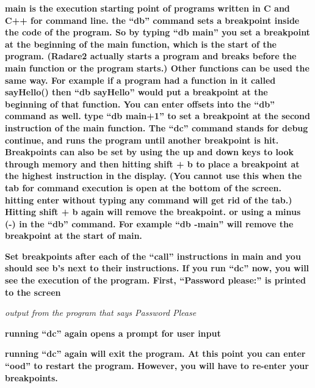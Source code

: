 \documentclass[letterpaper]{article}
\newcommand{\sitfig}[3]{
\begin{figure}[H]
\centering
\makebox[\textwidth][c]{
#2
}
\label{#1}
\end{figure}
}
\newcommand{\sitgfx}[4][scale=1.0]{
\sitfig{#3}{\texttt{[image: \#2]}}{#4}
}
\begin{document}
  
\sitgfx[width=5.8335in,height=3.6457in]{FINALWORKINGDOCFORMERLYPRECURSOR-img080.png}{fig:unk}{TODO CAPTION}
 

\textbf{main is the execution starting point of programs written in C and C++ for command line. the ``db'' command sets
a breakpoint inside the code of the program. So by typing ``db main'' you set a breakpoint at the beginning of the main
function, which is the start of the program. (Radare2 actually starts a program and breaks before the main function or
the program starts.) Other functions can be used the same way. For example if a program had a function in it called
sayHello() then ``db sayHello'' would put a breakpoint at the beginning of that function. You can enter offsets into
the ``db'' command as well. type ``db main+1'' to set a breakpoint at the second instruction of the main function. The
``dc'' command stands for debug continue, and runs the program until another breakpoint is hit. Breakpoints can also be
set by using the up and down keys to look through memory and then hitting shift + b to place a breakpoint at the
highest instruction in the display. (You cannot use this when the tab for command execution is open at the bottom of
the screen. hitting enter without typing any command will get rid of the tab.) Hitting shift + b again will remove the
breakpoint. or using a minus (-) in the ``db'' command. For example ``db -main'' will remove the breakpoint at the
start of main.}

  
\sitgfx[width=5.8335in,height=3.6457in]{FINALWORKINGDOCFORMERLYPRECURSOR-img081.png}{fig:unk}{TODO CAPTION}
 

\textbf{Set breakpoints after each of the ``call'' instructions in main and you should see b's next to their
instructions. If you run ``dc'' now, you will see the execution of the program. First, ``Password please:'' is printed
to the screen}

  
\sitgfx[width=5.8335in,height=3.6457in]{FINALWORKINGDOCFORMERLYPRECURSOR-img082.png}{fig:unk}{TODO CAPTION}
 

\textit{output from the program that says Password Please}

\textbf{running ``dc'' again opens a prompt for user input}

  
\sitgfx[width=5.8335in,height=3.6457in]{FINALWORKINGDOCFORMERLYPRECURSOR-img085.png}{fig:unk}{TODO CAPTION}
 

\textbf{running ``dc'' again will exit the program. At this point you can enter ``ood'' to restart the program. However,
you will have to re-enter your breakpoints.}
\end{document}

